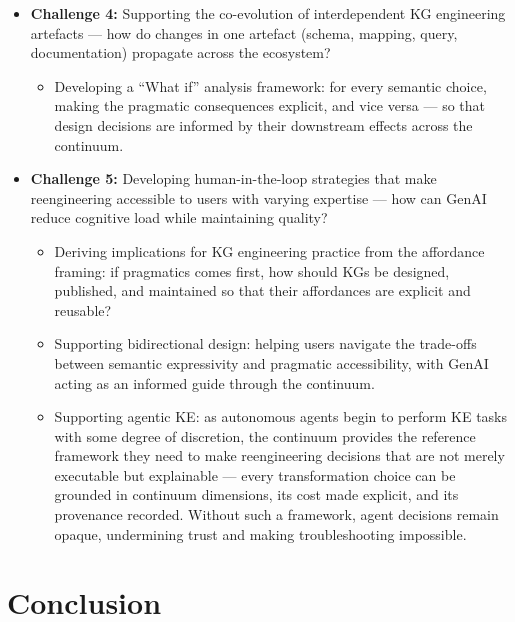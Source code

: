 \documentclass[runningheads]{llncs}
\begin{document}
\begin{itemize}
    \item \textbf{Challenge 4:} Supporting the co-evolution of interdependent KG engineering artefacts --- how do changes in one artefact (schema, mapping, query, documentation) propagate across the ecosystem?
    \begin{itemize}
        \item Developing a ``What if'' analysis framework: for every semantic choice, making the pragmatic consequences explicit, and vice versa --- so that design decisions are informed by their downstream effects across the continuum. %
    \end{itemize}
	
	\item \textbf{Challenge 5:} Developing human-in-the-loop strategies that make reengineering accessible to users with varying expertise --- how can GenAI reduce cognitive load while maintaining quality?
	    \begin{itemize}
	        \item Deriving implications for KG engineering practice from the affordance framing: if pragmatics comes first, how should KGs be designed, published, and maintained so that their affordances are explicit and reusable? %
	        \item Supporting bidirectional design: helping users navigate the trade-offs between semantic expressivity and pragmatic accessibility, with GenAI acting as an informed guide through the continuum. %
	        \item Supporting agentic KE: as autonomous agents begin to perform KE tasks with some degree of discretion, the continuum provides the reference framework they need to make reengineering decisions that are not merely executable but explainable --- every transformation choice can be grounded in continuum dimensions, its cost made explicit, and its provenance recorded. Without such a framework, agent decisions remain opaque, undermining trust and making troubleshooting impossible. %
	    \end{itemize}
\end{itemize}

\section{Conclusion}
\end{document}
